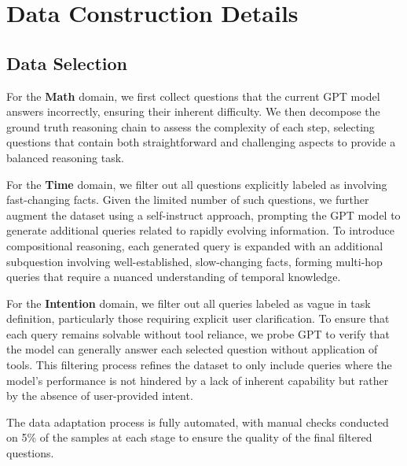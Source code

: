 \section{Data Construction Details}

\subsection{Data Selection}
\label{apdx:data_slection}
For the \textbf{Math} domain, we first collect questions that the current GPT model answers incorrectly, ensuring their inherent difficulty. We then decompose the ground truth reasoning chain to assess the complexity of each step, selecting questions that contain both straightforward and challenging aspects to provide a balanced reasoning task.

For the \textbf{Time} domain, we filter out all questions explicitly labeled as involving fast-changing facts. Given the limited number of such questions, we further augment the dataset using a self-instruct approach, prompting the GPT model to generate additional queries related to rapidly evolving information. To introduce compositional reasoning, each generated query is expanded with an additional subquestion involving well-established, slow-changing facts, forming multi-hop queries that require a nuanced understanding of temporal knowledge.

For the \textbf{Intention} domain, we filter out all queries labeled as vague in task definition, particularly those requiring explicit user clarification. To ensure that each query remains solvable without tool reliance, we probe GPT to verify that the model can generally answer each selected question without application of tools. This filtering process refines the dataset to only include queries where the model’s performance is not hindered by a lack of inherent capability but rather by the absence of user-provided intent.

The data adaptation process is fully automated, with manual checks conducted on 5\% of the samples at each stage to ensure the quality of the final filtered questions.

